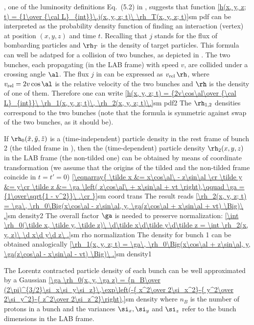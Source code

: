 
, one of the luminosity definitions  Eq.~(5.2) in , suggests that function
\eqref{h(x, y, z; t) = {1\over {\cal L}_{int}}\,j(x, y, z; t)\ \rh_T(x, y, z; t)}{sm pdf}
can be interpreted as the probability density function of finding an interaction (vertex) at position $(x, y, z)$ and time $t$. Recalling that $j$ stands for the flux of bombarding particles and $\rh_T$ is the density of target particles. This formula can well be adatped for a collision of two bunches, as depicted in . The two bunches, each propagating (in the LAB frame) with speed $v$, are collided under a crossing angle $\al$. The flux $j$ in  can be expressed as $v_{\rm rel}\,\rh$, where $v_{\rm rel} = 2v\cos\al$ is the relative velocity of the two bunches and $\rh$ is the density of one of them. Therefore one can write
\eqref{h(x, y, z; t) = {2v\cos\al\over {\cal L}_{int}}\ \rh_1(x, y, z; t)\, \rh_2(x, y, z; t)\.}{sm pdf2}
The $\rh_{1,2}$ densities correspond to the two bunches (note that the formula is symmetric against swap of the two bunches, as it should be).

If $\rh_0(\tilde x, \tilde y, \tilde z)$ is a (time-independent) particle density in the rest frame of bunch 2 (the tilded frame in ), then the (time-dependent) particle density $\rh_2(x, y, z)$ in the LAB frame (the non-tilded one) can be obtained by means of coordinate transformation (we assume that the origins of the tilded and the non-tilded frame coincide in $t=t'=0$)
\eqref{\eqnarray{
\tilde x &= x\cos\al\ - z\sin\al \cr
\tilde y &= y\cr
\tilde z &= \ga \left( z\cos\al\ + x\sin\al + vt \right),\qquad \ga = {1\over\sqrt{1 - v^2}}\ .\cr
}}{sm coord trans}
The result reads
\eqref{\rh_2(x, y, z; t) = \ga\, \rh_0\Big(x\cos\al - z\sin\al, y, \ga(z\cos\al + x\sin\al + vt) \Big)\ .}{sm density2}
The overall factor $\ga$ is needed to preserve normalization:
\eqref{\int \rh_0(\tilde x, \tilde y, \tilde z)\ \d\tilde x\d\tilde y\d\tilde z = \int \rh_2(x, y, z)\ \d x\d y\d z\ .}{sm rho normalization}
The density for bunch 1 can be obtained analogically
\eqref{\rh_1(x, y, z; t) = \ga\, \rh_0\Big(x\cos\al + z\sin\al, y, \ga(z\cos\al - x\sin\al - vt) \Big)\ .}{sm density1}

The Lorentz contracted particle density of each bunch can be well approximated by a Gaussian 
\eqref{\ga \rh_0(x, y, \ga z) = {n_B\over (2\pi)^{3/2}\si_x\si_y\si_z}\,\exp\left(-{ x^2\over 2\si_x^2}-{ y^2\over 2\si_y^2}-{ z^2\over 2\si_z^2}\right),}{sm density}
where $n_B$ is the number of protons in a bunch and the variances $\si_x, \si_y$ and $\si_z$ refer to the bunch dimensions in the LAB frame.

